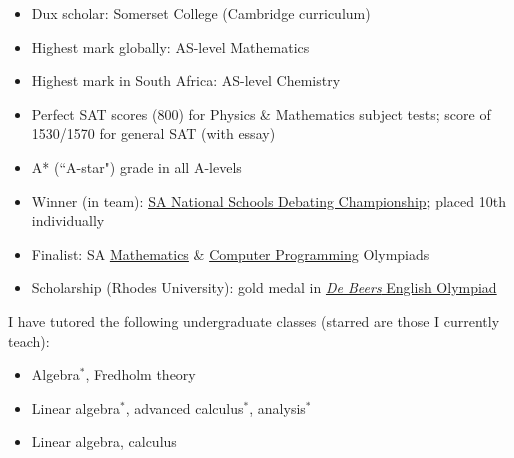 \documentclass[10pt,a4paper,ragged2e,withhyper]{altacv}
\begin{document}
\begin{paracol}{2}
\begin{itemize}
    \item Dux scholar: Somerset College (Cambridge curriculum)
    \item Highest mark globally: AS-level Mathematics
    \item Highest mark in South Africa: AS-level Chemistry
    \item Perfect SAT scores (800) for Physics \& Mathematics subject tests;
		score of 1530/1570 for general SAT (with essay)
    \item A* (``A-star") grade in all A-levels
    \item Winner (in team): \href{https://sadebating.org/phalaborwa-2016/}{SA National Schools Debating Championship};
		placed 10th individually
    \item Finalist: SA \href{https://www.samf.ac.za/en/sa-mathematics-olympiad}{Mathematics}
		\& \href{https://olympiad.org.za/programming-olympiad/}{Computer Programming} Olympiads
    \item Scholarship (Rhodes University): gold medal in
		\href{https://sacee.org.za/projects/english-olympiad/}{\emph{De Beers} English Olympiad}
\end{itemize}


\switchcolumn %


\smallskip
I have tutored the following undergraduate classes (starred are those I currently teach):
\medskip
\begin{itemize}
\item {} Algebra$^*$, Fredholm theory
\item {} Linear algebra$^*$, advanced calculus$^*$, analysis$^*$
\item {} Linear algebra, calculus
\end{itemize}


\end{paracol}
\end{document}
